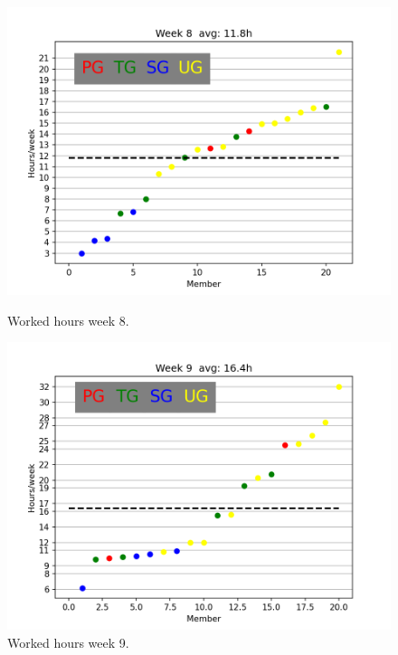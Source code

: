\documentclass{article}
\begin{document}
        \begin{figure}[!htb]
            \endminipage\hfill
              \includegraphics[width=\linewidth]{images/week_8.png}
              \caption{Worked hours week 8.}\label{fig:week8}
            \endminipage\hfill
              \includegraphics[width=\linewidth]{images/week_9.png}
              \caption{Worked hours week 9.}\label{fig:week9}
            \endminipage\hfill
            \endminipage\hfill
        \end{figure}
        
        
\end{document}
